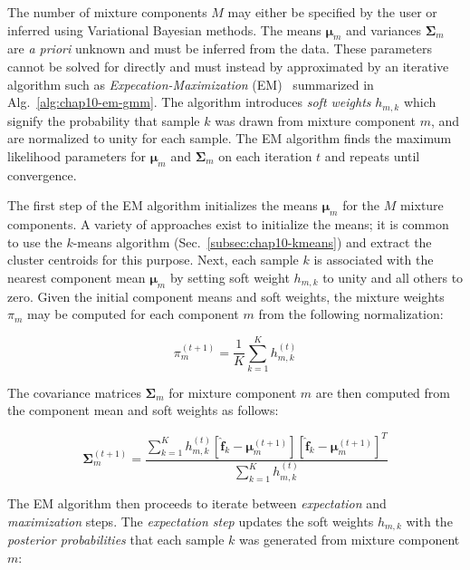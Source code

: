 The number of mixture components $M$ may either be specified by the user or inferred using Variational Bayesian methods. The means $\boldsymbol{\mu}_{m}$ and variances $\boldsymbol{\Sigma}_{m}$ are \textit{a priori} unknown and must be inferred from the data. These parameters cannot be solved for directly and must instead by approximated by an iterative algorithm such as \textit{Expecation-Maximization} (EM)~\cite{dempster1977em} summarized in Alg.~\ref{alg:chap10-em-gmm}. The algorithm introduces \textit{soft weights} $h_{m,k}$ which signify the probability that sample $k$ was drawn from mixture component $m$, and are normalized to unity for each sample. The EM algorithm finds the maximum likelihood parameters for $\boldsymbol{\mu}_{m}$ and $\boldsymbol{\Sigma}_{m}$ on each iteration $t$ and repeats until convergence. 

The first step of the EM algorithm initializes the means $\boldsymbol{\mu}_{m}$ for the $M$ mixture components. A variety of approaches exist to initialize the means; it is common to use the $k$-means algorithm (Sec.~\ref{subsec:chap10-kmeans}) and extract the cluster centroids for this purpose. Next, each sample $k$ is associated with the nearest component mean $\boldsymbol{\mu}_{m}$ by setting soft weight $h_{m,k}$ to unity and all others to zero. Given the initial component means and soft weights, the mixture weights $\pi_{m}$ may be computed for each component $m$ from the following normalization:

\begin{equation}
\label{eqn:em-weights}
\pi_{m}^{(t+1)} = \frac{1}{K}\displaystyle\sum\limits_{k=1}^{K} h_{m,k}^{(t)}
\end{equation}

\noindent The covariance matrices $\boldsymbol{\Sigma}_{m}$ for mixture component $m$ are then computed from the component mean and soft weights as follows:

\begin{equation}
\label{eqn:em-covariances}
\boldsymbol{\Sigma}_{m}^{(t+1)} = \frac{\displaystyle\sum\limits_{k=1}^{K}h_{m,k}^{(t)}\left[ \boldsymbol{\hat{f}}_{k} - \boldsymbol{\mu}_{m}^{(t+1)}\right]\left[ \boldsymbol{\hat{f}}_{k} - \boldsymbol{\mu}_{m}^{(t+1)}\right]^{T}}{\displaystyle\sum\limits_{k=1}^{K}h_{m,k}^{(t)}}
\end{equation}

The EM algorithm then proceeds to iterate between \textit{expectation} and \textit{maximization} steps. The \textit{expectation step} updates the soft weights $h_{m,k}$ with the \textit{posterior probabilities} that each sample $k$ was generated from mixture component $m$:

